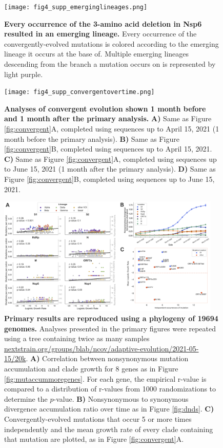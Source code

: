 \documentclass[11pt,oneside,letterpaper]{article}
\begin{document}
\begin{figure}[h!]
\centerline{\texttt{[image: fig4\_supp\_emerginglineages.png]}}
\caption{\textbf{Every occurrence of the 3-amino acid deletion in Nsp6 resulted in an emerging lineage.}
Every occurrence of the convergently-evolved mutations is colored according to the emerging lineage it occurs at the base of. Multiple emerging lineages descending from the branch a mutation occurs on is represented by light purple.
}
\label{fig:emerginglineages}
\end{figure}

\begin{figure}[h!]
\centerline{\texttt{[image: fig4\_supp\_convergentovertime.png]}}
\caption{\textbf{Analyses of convergent evolution shown 1 month before and 1 month after the primary analysis.}
\textbf{A)} Same as Figure \ref{fig:convergent}A, completed using sequences up to April 15, 2021 (1 month before the primary analysis). \textbf{B)} Same as Figure \ref{fig:convergent}B, completed using sequences up to April 15, 2021. \textbf{C)} Same as Figure \ref{fig:convergent}A, completed using sequences up to June 15, 2021 (1 month after the primary analysis). \textbf{D)} Same as Figure \ref{fig:convergent}B, completed using sequences up to June 15, 2021.
}
\label{fig:convergentovertime}
\end{figure}

\begin{figure}[h!]
\centerline{\includegraphics[width=0.95\textwidth]{disc_supp_20k.png}}
\caption{\textbf{Primary results are reproduced using a phylogeny of 19694 genomes.}
Analyses presented in the primary figures were repeated using a tree containing twice as many samples \href{https://nextstrain.org/groups/blab/ncov/adaptive-evolution/2021-05-15/20k}{nextstrain.org/groups/blab/ncov/adaptive-evolution/2021-05-15/20k}.
\textbf{A)} Correlation between nonsynonymous mutation accumulation and clade growth for 8 genes as in Figure \ref{fig:mutaccummoregenes}. For each gene, the empirical r-value is compared to a distribution of r-values from 1000 randomizations to determine the $p$-value. \textbf{B)} Nonsynonymous to synonymous divergence accumulation ratio over time as in Figure \ref{fig:dnds}. \textbf{C)} Convergently-evolved mutations that occur 5 or more times independently and the mean growth rate of every clade containing that mutation are plotted, as in Figure \ref{fig:convergent}A. 
}
\label{fig:20tree}
\end{figure}
\end{document}
